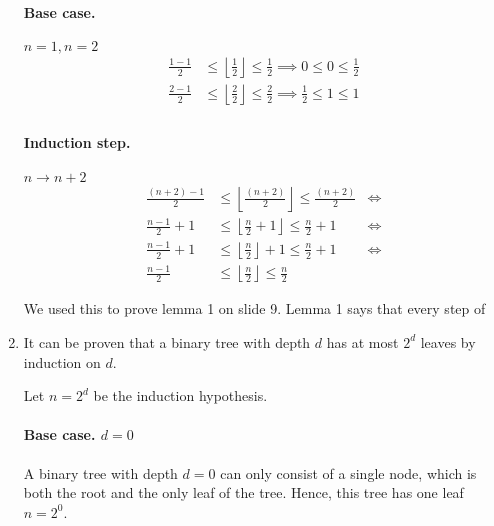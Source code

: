 \documentclass{article}
\begin{document}
\begin{enumerate}
{            \paragraph{Base case.} \(n=1, n=2\)
            \begin{displaymath}
                \begin{aligned}
                    \frac{1 - 1}{2} &\leq \left\lfloor\frac{1}{2}\right\rfloor \leq \frac{1}{2} \implies 0 \leq 0 \leq \frac{1}{2} \\
                    \frac{2 - 1}{2} &\leq \left\lfloor\frac{2}{2}\right\rfloor \leq \frac{2}{2} \implies \frac{1}{2} \leq 1 \leq 1 \\
                \end{aligned}
            \end{displaymath}

            \paragraph{Induction step.} \(n\to n+2\)
            \begin{displaymath}
                \begin{aligned}
                    \frac{(n + 2) - 1}{2} &\leq \left\lfloor\frac{(n + 2)}{2}\right\rfloor \leq \frac{(n + 2)}{2} & \Longleftrightarrow \\
                    \frac{n - 1}{2} + 1 &\leq \left\lfloor\frac{n}{2} + 1\right\rfloor \leq \frac{n}{2} + 1 & \Longleftrightarrow \\
                    \frac{n - 1}{2} + 1 &\leq \left\lfloor\frac{n}{2}\right\rfloor + 1 \leq \frac{n}{2} + 1 & \Longleftrightarrow \\
                    \frac{n - 1}{2} &\leq \left\lfloor\frac{n}{2}\right\rfloor \leq \frac{n}{2}
                \end{aligned}
            \end{displaymath}

            We used this to prove lemma 1 on slide 9. Lemma 1 says that every step of 
        }
        \item {
            It can be proven that a binary tree with depth \(d\) has at most \(2^d\) leaves by induction on \(d\).
            
            Let \(n = 2^d\) be the induction hypothesis.

            \paragraph{Base case. \(d=0\)}
            A binary tree with depth \(d = 0\) can only consist of a single node, which is both the root and the only leaf of the tree. Hence, this tree has one leaf \(n = 2^0\).

}
\end{enumerate}
\end{document}
